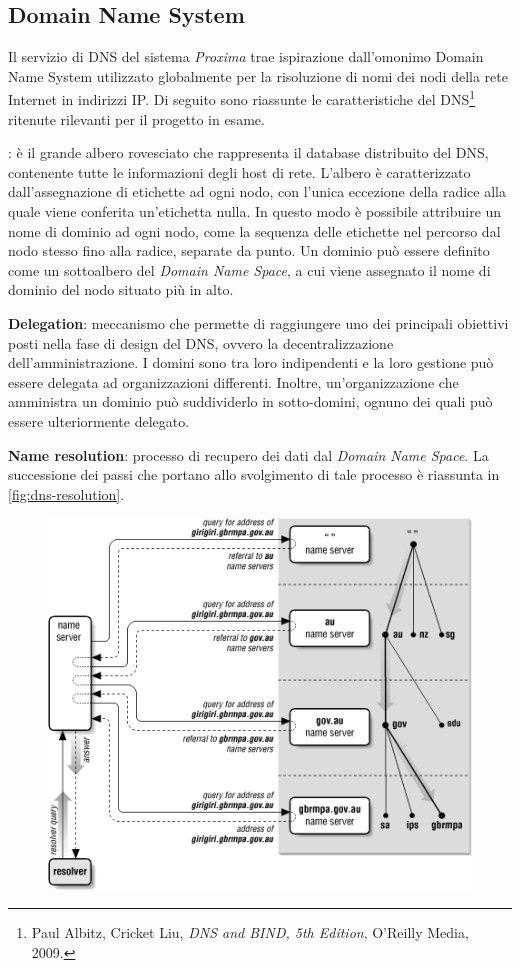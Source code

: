 \documentclass[a4paper,12pt]{report}
\begin{document}
\subsection{Domain Name System} \label{original-dns}
Il servizio di DNS del sistema \emph{Proxima} trae ispirazione dall'omonimo Domain Name System utilizzato globalmente per la risoluzione di nomi dei nodi della rete Internet in indirizzi IP. Di seguito sono riassunte le caratteristiche del DNS\footnote{Paul Albitz, Cricket Liu, {\em DNS and BIND, 5th Edition}, O'Reilly Media, 2009.} ritenute rilevanti per il progetto in esame.
\begin{description}
	\item[Domain Name Space]: è il grande albero rovesciato che rappresenta il database distribuito del DNS, contenente tutte le informazioni degli host di rete. L'albero è caratterizzato dall'assegnazione di etichette ad ogni nodo, con l'unica eccezione della radice alla quale viene conferita un'etichetta nulla. In questo modo è possibile attribuire un nome di dominio ad ogni nodo, come la sequenza delle etichette nel percorso dal nodo stesso fino alla radice, separate da punto. Un dominio può essere definito come un sottoalbero del \emph{Domain Name Space}, a cui viene assegnato il nome di dominio del nodo situato più in alto.
	\item \textbf{Delegation}: meccanismo che permette di raggiungere uno dei principali obiettivi posti nella fase di design del DNS, ovvero la decentralizzazione dell'amministrazione. I domini sono tra loro indipendenti e la loro gestione può essere delegata ad organizzazioni differenti. Inoltre, un'organizzazione che amministra un dominio può suddividerlo in sotto-domini, ognuno dei quali può essere ulteriormente delegato.
	\item \textbf{Name resolution}: processo di recupero dei dati dal \emph{Domain Name Space}. La successione dei passi che portano allo svolgimento di tale processo è riassunta in \autoref{fig:dns-resolution}.
	\begin{figure}[H]
		\centering
		\includegraphics[scale=0.60]{./img/dns-resolution.png}

\end{figure}
\end{description}
\end{document}
